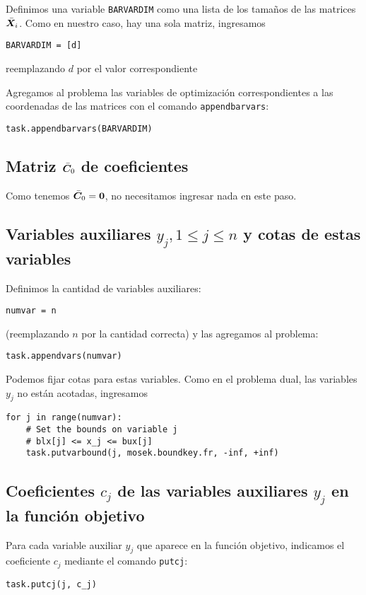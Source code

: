 \documentclass[11pt]{article}
\begin{document}
Definimos una variable \texttt{BARVARDIM} como una lista de los tamaños de las matrices $\bar {\bm{X}}_i$. Como en nuestro caso, hay una sola matriz, ingresamos
\begin{lstlisting}
BARVARDIM = [d]
\end{lstlisting}
reemplazando $d$ por el valor correspondiente

Agregamos al problema las variables de optimización correspondientes a las coordenadas de las matrices con el comando \texttt{appendbarvars}:

\begin{lstlisting}
task.appendbarvars(BARVARDIM)
\end{lstlisting}


\subsection{Matriz $\bar {\bm{C}}_0$ de coeficientes}

Como tenemos $\bar {\bm{C}}_0 = \bm{0}$, no necesitamos ingresar nada en este paso.

\subsection{Variables auxiliares $y_j, 1 \le j \le n$ y cotas de estas variables}

Definimos la cantidad de variables auxiliares:
\begin{lstlisting}
numvar = n
\end{lstlisting}
(reemplazando $n$ por la cantidad correcta) y las agregamos al problema:
\begin{lstlisting}
task.appendvars(numvar)
\end{lstlisting}

Podemos fijar cotas para estas variables. Como en el problema dual, las variables $y_j$ no están acotadas, ingresamos
\begin{lstlisting}
for j in range(numvar):
    # Set the bounds on variable j
    # blx[j] <= x_j <= bux[j]
    task.putvarbound(j, mosek.boundkey.fr, -inf, +inf)
\end{lstlisting}

\subsection{Coeficientes $c_j$ de las variables auxiliares $y_j$ en la función objetivo}
Para cada variable auxiliar $y_j$ que aparece en la función objetivo, indicamos el coeficiente $c_j$ mediante el comando \texttt{putcj}:
\begin{lstlisting}
task.putcj(j, c_j)
\end{lstlisting}
\end{document}
